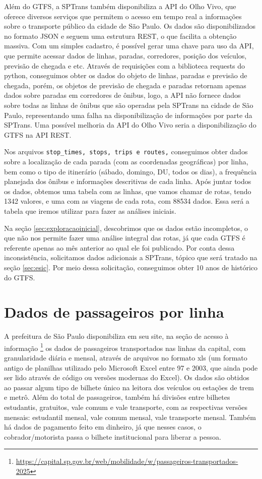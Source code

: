 Além do GTFS, a SPTrans também disponibiliza a  API do Olho Vivo, que oferece diversos serviços que permitem o acesso em tempo real a informações sobre o transporte público da cidade de São Paulo. Os dados são disponibilizados no formato JSON e seguem uma estrutura REST, o que facilita a obtenção massiva. Com um simples cadastro, é possível gerar uma chave para uso da API, que permite acessar dados de linhas, paradas, corredores, posição dos veículos, previsão de chegada e etc. Através de requisições com a biblioteca requests do python, conseguimos obter os dados do objeto de linhas, paradas e previsão de chegada, porém, os objetos de previsão de chegada e paradas retornam apenas dados sobre paradas em corredores de ônibus, logo, a API não fornece dados sobre todas as linhas de ônibus que são operadas pela SPTrans na cidade de São Paulo, representando uma falha na disponibilização de informações por parte da SPTrans. Uma possível melhoria da API do Olho Vivo seria a disponibilização do GTFS na API REST.

Nos arquivos \verb|stop_times, stops, trips e routes,| conseguimos obter dados sobre a localização de cada parada (com as coordenadas geográficas) por linha, bem como o tipo de itinerário (sábado, domingo, DU, todos os dias), a frequência planejada dos ônibus e informações descritivas de cada linha. Após juntar todos os dados, obtemos uma tabela com as linhas, que vamos chamar de rotas, tendo 1342 valores, e uma com as viagens de cada rota, com 88534 dados. Essa será a tabela que iremos utilizar para fazer as análises iniciais. 

Na seção \ref{sec:exploracaoinicial}, descobrimos que os dados estão incompletos, o que não nos permite fazer uma análise integral das rotas, já que cada GTFS é referente apenas ao mês anterior ao qual ele foi publicado. Por conta dessa inconsistência, solicitamos dados adicionais a SPTrans, tópico que será tratado na seção \ref{sec:esic}. Por meio dessa solicitação, conseguimos obter 10 anos de histórico do GTFS.


\section{Dados de passageiros por linha}

A prefeitura de São Paulo disponibiliza em seu site, na seção de acesso à informação \footnote{\url{https://capital.sp.gov.br/web/mobilidade/w/passageiros-transportados-2025}} os dados de passageiros transportados nas linhas da capital, com granularidade diária e mensal, através de arquivos no formato xls (um formato antigo de planilhas utilizado pelo Microsoft Excel entre 97 e 2003, que ainda pode ser lido através de código ou versões modernas do Excel). Os dados são obtidos ao passar algum tipo de bilhete único na leitora dos veículos ou estações de trem e metrô. Além do total de passageiros, também há divisões entre bilhetes estudantis, gratuitos, vale comum e vale transporte, com as respectivas versões mensais: estudantil mensal, vale comum mensal, vale transporte mensal. Também há dados de pagamento feito em dinheiro, já que nesses casos, o cobrador/motorista passa o bilhete institucional para liberar a pessoa.


